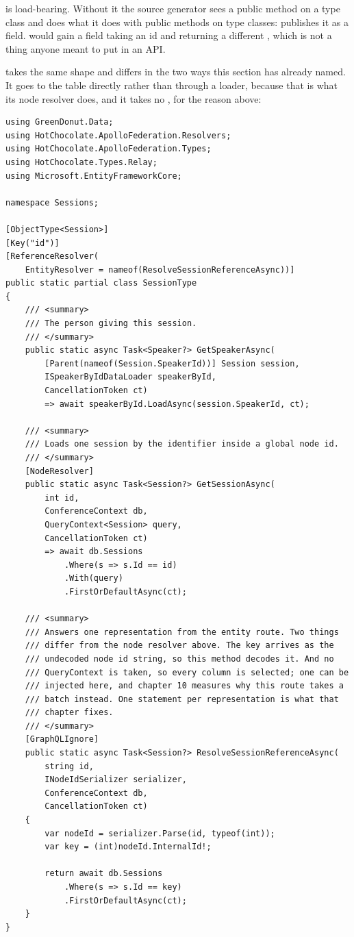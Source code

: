 %
\code{[GraphQLIgnore]} is load-bearing. Without it the source generator sees a
public method on a type class and does what it does with public methods on type
classes: publishes it as a field.  would gain a field taking an id
and returning a different , which is not a thing anyone meant to
put in an API.

%
 takes the same shape and differs in the two ways this
section has already named. It goes to the table directly rather than through a
loader, because that is what its node resolver does, and it takes no
, for the reason above:

\begin{verbatim}
using GreenDonut.Data;
using HotChocolate.ApolloFederation.Resolvers;
using HotChocolate.ApolloFederation.Types;
using HotChocolate.Types.Relay;
using Microsoft.EntityFrameworkCore;

namespace Sessions;

[ObjectType<Session>]
[Key("id")]
[ReferenceResolver(
    EntityResolver = nameof(ResolveSessionReferenceAsync))]
public static partial class SessionType
{
    /// <summary>
    /// The person giving this session.
    /// </summary>
    public static async Task<Speaker?> GetSpeakerAsync(
        [Parent(nameof(Session.SpeakerId))] Session session,
        ISpeakerByIdDataLoader speakerById,
        CancellationToken ct)
        => await speakerById.LoadAsync(session.SpeakerId, ct);

    /// <summary>
    /// Loads one session by the identifier inside a global node id.
    /// </summary>
    [NodeResolver]
    public static async Task<Session?> GetSessionAsync(
        int id,
        ConferenceContext db,
        QueryContext<Session> query,
        CancellationToken ct)
        => await db.Sessions
            .Where(s => s.Id == id)
            .With(query)
            .FirstOrDefaultAsync(ct);

    /// <summary>
    /// Answers one representation from the entity route. Two things
    /// differ from the node resolver above. The key arrives as the
    /// undecoded node id string, so this method decodes it. And no
    /// QueryContext is taken, so every column is selected; one can be
    /// injected here, and chapter 10 measures why this route takes a
    /// batch instead. One statement per representation is what that
    /// chapter fixes.
    /// </summary>
    [GraphQLIgnore]
    public static async Task<Session?> ResolveSessionReferenceAsync(
        string id,
        INodeIdSerializer serializer,
        ConferenceContext db,
        CancellationToken ct)
    {
        var nodeId = serializer.Parse(id, typeof(int));
        var key = (int)nodeId.InternalId!;

        return await db.Sessions
            .Where(s => s.Id == key)
            .FirstOrDefaultAsync(ct);
    }
}
\end{verbatim}

